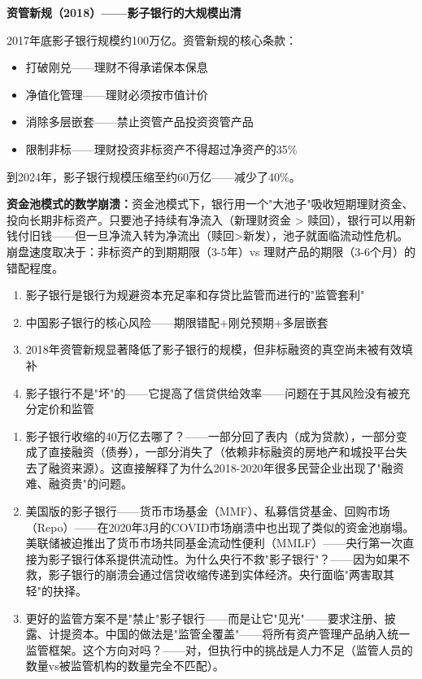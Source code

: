 \documentclass[a4paper,11pt]{ctexbook}
\begin{document}
\begin{quantitative}
\textbf{资管新规（2018）——影子银行的大规模出清}

2017年底影子银行规模约100万亿。资管新规的核心条款：
\begin{itemize}
  \item 打破刚兑——理财不得承诺保本保息
  \item 净值化管理——理财必须按市值计价
  \item 消除多层嵌套——禁止资管产品投资资管产品
  \item 限制非标——理财投资非标资产不得超过净资产的35\%
\end{itemize}

到2024年，影子银行规模压缩至约60万亿——减少了40\%。

\textbf{资金池模式的数学崩溃：}资金池模式下，银行用一个"大池子"吸收短期理财资金、投向长期非标资产。只要池子持续有净流入（新理财资金 > 赎回），银行可以用新钱付旧钱——但一旦净流入转为净流出（赎回>新发），池子就面临流动性危机。崩盘速度取决于：非标资产的到期期限（3-5年）vs 理财产品的期限（3-6个月）的错配程度。
\end{quantitative}

\begin{lessonsummary}
\begin{enumerate}
  \item 影子银行是银行为规避资本充足率和存贷比监管而进行的"监管套利"
  \item 中国影子银行的核心风险——期限错配+刚兑预期+多层嵌套
  \item 2018年资管新规显著降低了影子银行的规模，但非标融资的真空尚未被有效填补
  \item 影子银行不是"坏"的——它提高了信贷供给效率——问题在于其风险没有被充分定价和监管
\end{enumerate}
\end{lessonsummary}

\begin{discuss}
\begin{enumerate}
  \item 影子银行收缩的40万亿去哪了？——一部分回了表内（成为贷款），一部分变成了直接融资（债券），一部分消失了（依赖非标融资的房地产和城投平台失去了融资来源）。这直接解释了为什么2018-2020年很多民营企业出现了"融资难、融资贵"的问题。
  \item 美国版的影子银行——货币市场基金（MMF）、私募信贷基金、回购市场（Repo）——在2020年3月的COVID市场崩溃中也出现了类似的资金池崩塌。美联储被迫推出了货币市场共同基金流动性便利（MMLF）——央行第一次直接为影子银行体系提供流动性。为什么央行不救"影子银行"？——因为如果不救，影子银行的崩溃会通过信贷收缩传递到实体经济。央行面临"两害取其轻"的抉择。
  \item 更好的监管方案不是"禁止"影子银行——而是让它"见光"——要求注册、披露、计提资本。中国的做法是"监管全覆盖"——将所有资产管理产品纳入统一监管框架。这个方向对吗？——对，但执行中的挑战是人力不足（监管人员的数量vs被监管机构的数量完全不匹配）。
\end{enumerate}
\end{discuss}
\end{document}
